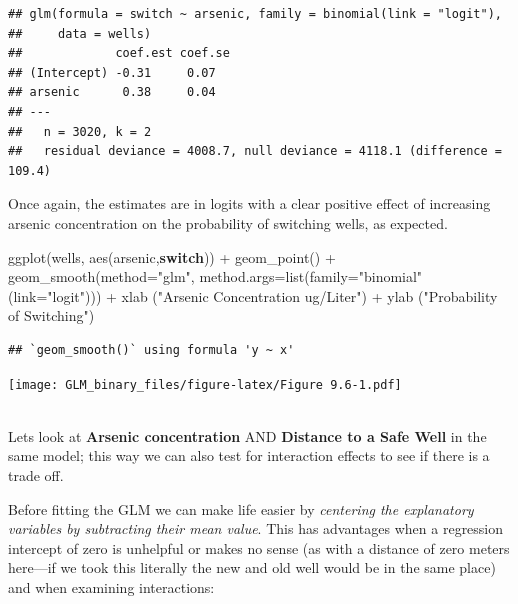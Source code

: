 \documentclass[
]{article}
\newenvironment{Shaded}{\begin{snugshade}}{\end{snugshade}}
\newcommand{\AttributeTok}[1]{\textcolor[rgb]{0.77,0.63,0.00}{#1}}
\newcommand{\ControlFlowTok}[1]{\textcolor[rgb]{0.13,0.29,0.53}{\textbf{#1}}}
\newcommand{\FunctionTok}[1]{\textcolor[rgb]{0.00,0.00,0.00}{#1}}
\newcommand{\NormalTok}[1]{#1}
\newcommand{\SpecialCharTok}[1]{\textcolor[rgb]{0.00,0.00,0.00}{#1}}
\newcommand{\StringTok}[1]{\textcolor[rgb]{0.31,0.60,0.02}{#1}}
\begin{document}
\begin{verbatim}
## glm(formula = switch ~ arsenic, family = binomial(link = "logit"), 
##     data = wells)
##             coef.est coef.se
## (Intercept) -0.31     0.07  
## arsenic      0.38     0.04  
## ---
##   n = 3020, k = 2
##   residual deviance = 4008.7, null deviance = 4118.1 (difference = 109.4)
\end{verbatim}

Once again, the estimates are in logits with a clear positive effect of
increasing arsenic concentration on the probability of switching wells,
as expected.

\begin{Shaded}
\begin{Highlighting}[]
\FunctionTok{ggplot}\NormalTok{(wells, }\FunctionTok{aes}\NormalTok{(arsenic,}\ControlFlowTok{switch}\NormalTok{)) }\SpecialCharTok{+}
         \FunctionTok{geom\_point}\NormalTok{() }\SpecialCharTok{+}
         \FunctionTok{geom\_smooth}\NormalTok{(}\AttributeTok{method=}\StringTok{"glm"}\NormalTok{, }\AttributeTok{method.args=}\FunctionTok{list}\NormalTok{(}\AttributeTok{family=}\StringTok{"binomial"}\NormalTok{(}\AttributeTok{link=}\StringTok{"logit"}\NormalTok{))) }\SpecialCharTok{+} 
         \FunctionTok{xlab}\NormalTok{ (}\StringTok{"Arsenic Concentration ug/Liter"}\NormalTok{) }\SpecialCharTok{+}
         \FunctionTok{ylab}\NormalTok{ (}\StringTok{"Probability of Switching"}\NormalTok{)}
\end{Highlighting}
\end{Shaded}

\begin{verbatim}
## `geom_smooth()` using formula 'y ~ x'
\end{verbatim}

\texttt{[image: GLM\_binary\_files/figure-latex/Figure 9.6-1.pdf]}\\
\strut \\
Lets look at \textbf{Arsenic concentration} AND \textbf{Distance to a
Safe Well} in the same model; this way we can also test for interaction
effects to see if there is a trade off.

Before fitting the GLM we can make life easier by \emph{centering the
explanatory variables by subtracting their mean value}. This has
advantages when a regression intercept of zero is unhelpful or makes no
sense (as with a distance of zero meters here---if we took this
literally the new and old well would be in the same place) and when
examining interactions:
\end{document}
